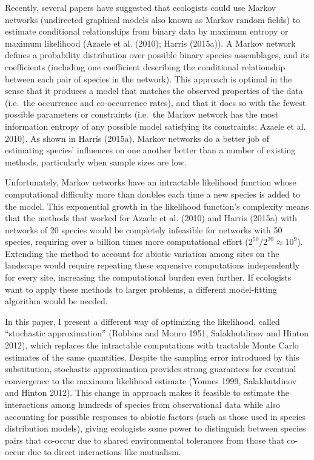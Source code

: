 \documentclass[12pt,]{article}
\begin{document}
\begin{spacing}{1.9}
\begin{flushleft}
Recently, several papers have suggested that ecologists could use Markov
networks (undirected graphical models also known as Markov random
fields) to estimate conditional relationships from binary data by
maximum entropy or maximum likelihood (Azaele et al. (2010); Harris
(2015a)). A Markov network defines a probability distribution over
possible binary species assemblages, and its coefficients (including one
coefficient describing the conditional relationship between each pair of
species in the network). This approach is optimal in the sense that it
produces a model that matches the observed properties of the data
(i.e.~the occurrence and co-occurrence rates), and that it does so with
the fewest possible parameters or constraints (i.e.~the Markov network
has the most information entropy of any possible model satisfying its
constraints; Azaele et al. 2010). As shown in Harris (2015a), Markov
networks do a better job of estimating species' influences on one
another better than a number of existing methods, particularly when
sample sizes are low.

Unfortunately, Markov networks have an intractable likelihood function
whose computational difficulty more than doubles each time a new species
is added to the model. This exponential growth in the likelihood
function's complexity means that the methods that worked for Azaele et
al. (2010) and Harris (2015a) with networks of 20 species would be
completely infeasible for networks with 50 species, requiring over a
billion times more computational effort
(\(2^{50}/2^{20} \approx 10^{9}\)). Extending the method to account for
abiotic variation among sites on the landscape would require repeating
these expensive computations independently for every site, increasing
the computational burden even further. If ecologists want to apply these
methods to larger problems, a different model-fitting algorithm would be
needed.

In this paper, I present a different way of optimizing the likelihood,
called ``stochastic approximation'' (Robbins and Monro 1951,
Salakhutdinov and Hinton 2012), which replaces the intractable
computations with tractable Monte Carlo estimates of the same
quantities. Despite the sampling error introduced by this substitution,
stochastic approximation provides strong guarantees for eventual
convergence to the maximum likelihood estimate (Younes 1999,
Salakhutdinov and Hinton 2012). This change in approach makes it
feasible to estimate the interactions among hundreds of species from
observational data while also accounting for possible responses to
abiotic factors (such as those used in species distribution models),
giving ecologists some power to distinguish between species pairs that
co-occur due to shared environmental tolerances from those that co-occur
due to direct interactions like mutualism.


\end{flushleft}
\end{spacing}
\end{document}
